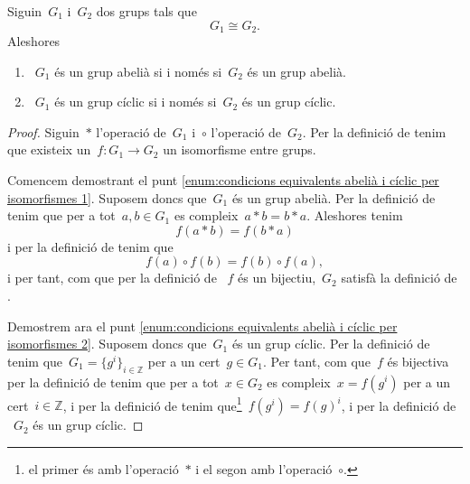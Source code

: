 \documentclass[../../main.tex]{subfiles}
\begin{document}
    \begin{proposition}
        \label{prop:condicions equivalents abelià i cíclic per isomorfismes}
        Siguin~\(G_{1}\) i~\(G_{2}\) dos grups tals que
        \[
            G_{1}\cong G_{2}.
        \]
        Aleshores
        \begin{enumerate}
            \item\label{enum:condicions equivalents abelià i cíclic per isomorfismes 1}~\(G_{1}\) és un grup abelià si i només si~\(G_{2}\) és un grup abelià.
            \item\label{enum:condicions equivalents abelià i cíclic per isomorfismes 2}~\(G_{1}\) és un grup cíclic si i només si~\(G_{2}\) és un grup cíclic.
        \end{enumerate}
    \end{proposition}
    \begin{proof}
        Siguin~\(\ast\) l'operació de~\(G_{1}\) i~\(\circ\) l'operació de~\(G_{2}\).
        Per la definició de  tenim que existeix un~\(f\colon G_{1}\to G_{2}\) un isomorfisme entre grups.

        Comencem demostrant el punt \eqref{enum:condicions equivalents abelià i cíclic per isomorfismes 1}.
        Suposem doncs que~\(G_{1}\) és un grup abelià.
        Per la definició de  tenim que per a tot~\(a,b\in G_{1}\) es compleix~\(a\ast b=b\ast a\).
        Aleshores tenim
        \[
            f(a\ast b)=f(b\ast a)
        \]
        i per la definició de  tenim que
        \[
            f(a)\circ f(b)=f(b)\circ f(a),
        \]
        i per tant, com que per la definició de ~\(f\) és un bijectiu,~\(G_{2}\) satisfà la definició de .

        Demostrem ara el punt \eqref{enum:condicions equivalents abelià i cíclic per isomorfismes 2}.
        Suposem doncs que~\(G_{1}\) és un grup cíclic.
        Per la definició de  tenim que~\(G_{1}=\{g^{i}\}_{i\in\mathbb{Z}}\) per a un cert~\(g\in G_{1}\).
        Per tant, com que~\(f\) és bijectiva per la definició de  tenim que per a tot~\(x\in G_{2}\) es compleix~\(x=f(g^{i})\) per a un cert~\(i\in\mathbb{Z}\), i per la definició de  tenim que\footnote{el primer és amb l'operació~\(\ast\) i el segon amb l'operació~\(\circ\).}~\(f(g^{i})=f(g)^{i}\), i per la definició de ~\(G_{2}\) és un grup cíclic.
    \end{proof}
\end{document}
